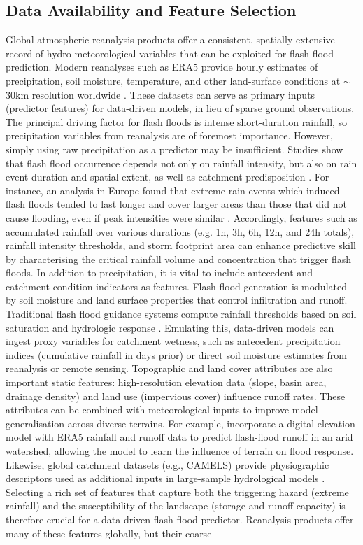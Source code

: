 \subsection{Data Availability and Feature Selection} Global atmospheric reanalysis products offer a consistent, spatially extensive record of hydro-meteorological variables that can be exploited for flash flood prediction. Modern reanalyses such as ERA5 provide hourly estimates of precipitation, soil moisture, temperature, and other land-surface conditions at $\sim$30km resolution worldwide \citep{Hersbach2020}. These datasets can serve as primary inputs (predictor features) for data-driven models, in lieu of sparse ground observations. The principal driving factor for flash floods is intense short-duration rainfall, so precipitation variables from reanalysis are of foremost importance. However, simply using raw precipitation as a predictor may be insufficient. Studies show that flash flood occurrence depends not only on rainfall intensity, but also on rain event duration and spatial extent, as well as catchment predisposition \citep{Hapuarachchi2011}. For instance, an analysis in Europe found that extreme rain events which induced flash floods tended to last longer and cover larger areas than those that did not cause flooding, even if peak intensities were similar \citep{Bronstert2021}. Accordingly, features such as accumulated rainfall over various durations (e.g. 1h, 3h, 6h, 12h, and 24h totals), rainfall intensity thresholds, and storm footprint area can enhance predictive skill by characterising the critical rainfall volume and concentration that trigger flash floods. In addition to precipitation, it is vital to include antecedent and catchment-condition indicators as features. Flash flood generation is modulated by soil moisture and land surface properties that control infiltration and runoff. Traditional flash flood guidance systems compute rainfall thresholds based on soil saturation and hydrologic response \citep{Georgakakos2022}. Emulating this, data-driven models can ingest proxy variables for catchment wetness, such as antecedent precipitation indices (cumulative rainfall in days prior) or direct soil moisture estimates from reanalysis or remote sensing. Topographic and land cover attributes are also important static features: high-resolution elevation data (slope, basin area, drainage density) and land use (impervious cover) influence runoff rates. These attributes can be combined with meteorological inputs to improve model generalisation across diverse terrains. For example, \citet{Alkaabi2025} incorporate a digital elevation model with ERA5 rainfall and runoff data to predict flash-flood runoff in an arid watershed, allowing the model to learn the influence of terrain on flood response. Likewise, global catchment datasets (e.g., CAMELS) provide physiographic descriptors used as additional inputs in large-sample hydrological models \citep{Kratzert2019}. Selecting a rich set of features that capture both the triggering hazard (extreme rainfall) and the susceptibility of the landscape (storage and runoff capacity) is therefore crucial for a data-driven flash flood predictor. Reanalysis products offer many of these features globally, but their coarse 